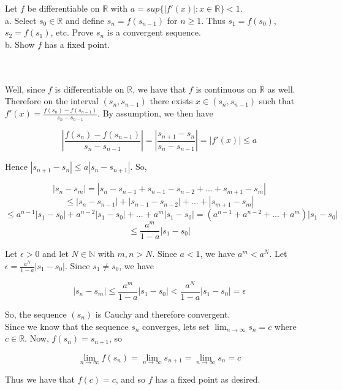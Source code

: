 Let $f$ be differentiable on $\mathbb{R}$ with $a=sup\{|f'(x)|:x\in\mathbb{R}\}<1$.\\

a. Select $s_0\in\mathbb{R}$ and define $s_n=f(s_{n-1})$ for $n\geq1$. Thus $s_1=f(s_0)$, $s_2=f(s_1)$,
etc. Prove $s_n$ is a convergent sequence.\\

b. Show $f$ has a fixed point.\\\\

\begin{solution}\renewcommand{\qedsymbol}{}\ \\
    Well, since $f$ is differentiable on $\mathbb{R}$, we have that $f$ is continuous on $\mathbb{R}$ as
    well. Therefore on the interval $(s_n, s_{n-1})$ there exists $x\in(s_n, s_{n-1})$ such that
    $f'(x)=\frac{f(s_n)-f(s_{n-1})}{s_n-s_{n-1}}$. By assumption, we then have
    
    $$|\frac{f(s_n)-f(s_{n-1})}{s_n-s_{n-1}}|=|\frac{s_{n+1}-s_n}{s_n-s_{n-1}}|=|f'(x)|\leq a$$
    
    Hence $|s_{n+1}-s_n|\leq a|s_n-s_{n+1}|$. So,
    
    $$|s_n-s_m|=|s_n-s_{n-1}+s_{n-1}-s_{n-2}+...+s_{m+1}-s_m|$$
    $$\leq|s_n-s_{n-1}|+|s_{n-1}-s_{n-2}|+...+|s_{m+1}-s_m|$$
    $$\leq a^{n-1}|s_1-s_0|+a^{n-2}|s_1-s_0|+...+a^m|s_1-s_0|=(a^{n-1}+a^{n-2}+...+a^m)|s_1-s_0|$$
    $$\leq\frac{a^m}{1-a}|s_1-s_0|$$
    
    Let $\epsilon>0$ and let $N\in\mathbb{N}$ with $m,n>N$. Since $a<1$, we have $a^m<a^N$. Let
    $\epsilon=\frac{a^N}{1-a}|s_1-s_0|$. Since $s_1\neq s_0$, we have
    
    $$|s_n-s_m|\leq\frac{a^m}{1-a}|s_1-s_0|<\frac{a^N}{1-a}|s_1-s_0|=\epsilon$$
    
    So, the sequence $(s_n)$ is Cauchy and therefore convergent.\\

    Since we know that the sequence $s_n$ converges, lets set $\lim_{n\rightarrow\infty}s_n=c$ where
    $c\in\mathbb{R}$. Now, $f(s_n)=s_{n+1}$, so
    
    $$\lim_{n\rightarrow\infty}f(s_n)=\lim_{n\rightarrow\infty}s_{n+1}=\lim_{n\rightarrow\infty}s_n=c$$
    
    Thus we have that $f(c)=c$, and so $f$ has a fixed point as desired.

\end{solution}